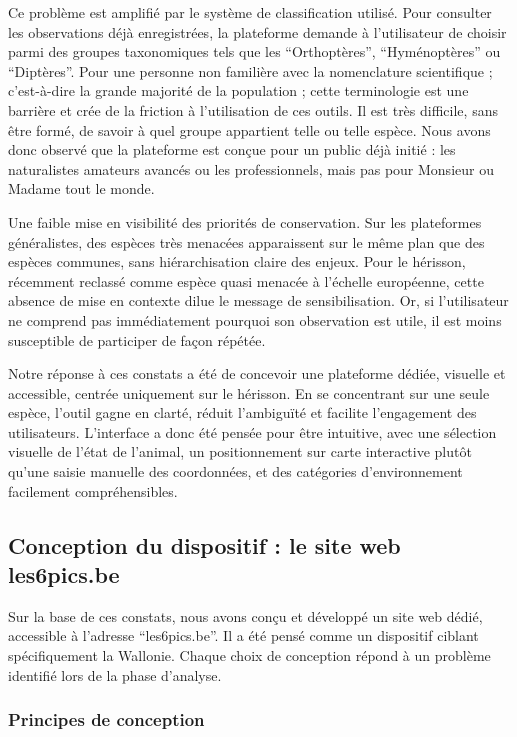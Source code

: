 \documentclass[a4paper,11pt]{article}
\begin{document}
Ce problème est amplifié par le système de classification utilisé. Pour consulter les observations déjà enregistrées, la plateforme demande à l'utilisateur de choisir parmi des groupes taxonomiques tels que les \enquote{Orthoptères}, \enquote{Hyménoptères} ou \enquote{Diptères}. Pour une personne non familière avec la nomenclature scientifique ; c'est-à-dire la grande majorité de la population ; cette terminologie est une barrière et crée de la friction à l’utilisation de ces outils. Il est très difficile, sans être formé, de savoir à quel groupe appartient telle ou telle espèce. Nous avons donc observé que la plateforme est conçue pour un public déjà initié : les naturalistes amateurs avancés ou les professionnels, mais pas pour Monsieur ou Madame tout le monde.

Une faible mise en visibilité des priorités de conservation. Sur les plateformes généralistes, des espèces très menacées apparaissent sur le même plan que des espèces communes, sans hiérarchisation claire des enjeux. Pour le hérisson, récemment reclassé comme espèce quasi menacée à l’échelle européenne, cette absence de mise en contexte dilue le message de sensibilisation. Or, si l’utilisateur ne comprend pas immédiatement pourquoi son observation est utile, il est moins susceptible de participer de façon répétée.

Notre réponse à ces constats a été de concevoir une plateforme dédiée, visuelle et accessible, centrée uniquement sur le hérisson. En se concentrant sur une seule espèce, l’outil gagne en clarté, réduit l’ambiguïté et facilite l’engagement des utilisateurs. L’interface a donc été pensée pour être intuitive, avec une sélection visuelle de l’état de l’animal, un positionnement sur carte interactive plutôt qu’une saisie manuelle des coordonnées, et des catégories d’environnement facilement compréhensibles.

\subsection{Conception du dispositif : le site web les6pics.be}

Sur la base de ces constats, nous avons conçu et développé un site web dédié, accessible à l'adresse \enquote{les6pics.be}. Il a été pensé comme un dispositif ciblant spécifiquement la Wallonie. Chaque choix de conception répond à un problème identifié lors de la phase d'analyse.

\subsubsection{Principes de conception}
\end{document}
